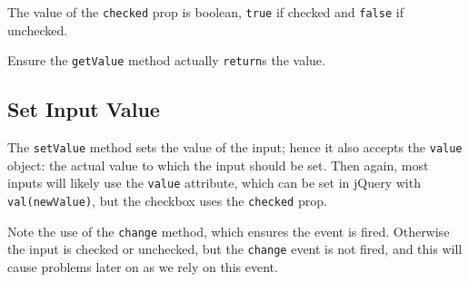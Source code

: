 \documentclass[10pt,]{krantz}
\makeatletter
\newenvironment{Shaded}{\begin{snugshade}}{\end{snugshade}}
\newcommand{\AttributeTok}[1]{\textcolor[rgb]{0.61,0.61,0.61}{#1}}
\newcommand{\CommentTok}[1]{\textcolor[rgb]{0.37,0.37,0.37}{\textit{#1}}}
\newcommand{\ControlFlowTok}[1]{\textcolor[rgb]{0.27,0.27,0.27}{\textbf{#1}}}
\newcommand{\DataTypeTok}[1]{\textcolor[rgb]{0.27,0.27,0.27}{#1}}
\newcommand{\KeywordTok}[1]{\textcolor[rgb]{0.27,0.27,0.27}{\textbf{#1}}}
\newcommand{\NormalTok}[1]{#1}
\newcommand{\OperatorTok}[1]{\textcolor[rgb]{0.43,0.43,0.43}{\textbf{#1}}}
\newcommand{\StringTok}[1]{\textcolor[rgb]{0.5,0.5,0.5}{#1}}
\newcommand{\VariableTok}[1]{\textcolor[rgb]{0,0,0}{#1}}
\newenvironment{kframe}{%
\medskip{}
\setlength{\fboxsep}{.8em}
 \def\at@end@of@kframe{}%
 \ifinner\ifhmode%
  \def\at@end@of@kframe{\end{minipage}}%
  \begin{minipage}{\columnwidth}%
 \fi\fi%
 \def\FrameCommand##1{\hskip\@totalleftmargin \hskip-\fboxsep
 \colorbox{shadecolor}{##1}\hskip-\fboxsep
     \hskip-\linewidth \hskip-\@totalleftmargin \hskip\columnwidth}%
 \MakeFramed {\advance\hsize-\width
   \@totalleftmargin\z@ \linewidth\hsize
   \@setminipage}}%
 {\par\unskip\endMakeFramed%
 \at@end@of@kframe}
\renewenvironment{Shaded}{\begin{kframe}}{\end{kframe}}
\newenvironment{rmdblock}[1]
  {
  \begin{itemize}
  \renewcommand{\labelitemi}{
    \raisebox{-.7\height}[0pt][0pt]{
      {\setkeys{Gin}{width=3em,keepaspectratio}\texttt{[image: images/\#1]}}
    }
  }
  \setlength{\fboxsep}{1em}
  \begin{kframe}
  \item
  }
  {
  \end{kframe}
  \end{itemize}
  }
\newenvironment{rmdnote}
  {\begin{rmdblock}{note}}
  {\end{rmdblock}}
\makeatother
\begin{document}
The value of the \texttt{checked} prop is boolean, \texttt{true} if checked and \texttt{false} if unchecked.

\begin{rmdnote}
Ensure the \texttt{getValue} method actually \texttt{return}s the value.
\end{rmdnote}

\hypertarget{shiny-input-set-value}{%
\subsection{Set Input Value}\label{shiny-input-set-value}}

The \texttt{setValue} method sets the value of the input; hence it also accepts the \texttt{value} object: the actual value to which the input should be set. Then again, most inputs will likely use the \texttt{value} attribute, which can be set in jQuery with \texttt{val(newValue)}, but the checkbox uses the \texttt{checked} prop.

\begin{Shaded}
\end{Shaded}

Note the use of the \texttt{change} method, which ensures the event is fired. Otherwise the input is checked or unchecked, but the \texttt{change} event is not fired, and this will cause problems later on as we rely on this event.
\end{document}
